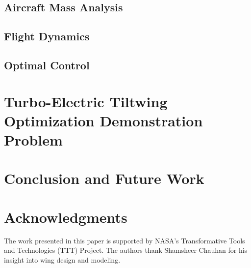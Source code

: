 \documentclass[conf]{new-aiaa}
\begin{document}
\subsection{Aircraft Mass Analysis}

\subsection{Flight Dynamics}


\subsection{Optimal Control}



\section{Turbo-Electric Tiltwing Optimization Demonstration Problem}\label{sec:opt_prob}


\section{Conclusion and Future Work}\label{sec:conc}


\section*{Acknowledgments}
The work presented in this paper is supported by NASA's Transformative Tools and Technologies (TTT) Project.
The authors thank Shamsheer Chauhan for his insight into wing design and modeling.


\end{document}
